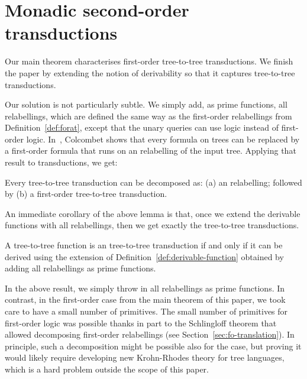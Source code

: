 \section{Monadic second-order transductions}
\label{sec:mso-trans}
Our main theorem characterises first-order tree-to-tree transductions. We finish the paper by extending the notion of derivability so that it captures  \mso tree-to-tree transductions. 

Our solution is not particularly subtle. We simply add, as prime functions, all \mso relabellings, which are defined the  same way as the first-order relabellings from Definition~\ref{def:forat}, except that the unary queries can use \mso logic instead of first-order logic. In~\cite[Corollary 1]{colcombetCombinatorialTheoremTrees2007}, Colcombet shows that every \mso formula on trees can be replaced by a first-order formula that runs on an \mso relabelling of the input tree. Applying that result to transductions, we get:
\begin{lemma}
    Every \mso tree-to-tree transduction can be decomposed as: (a) an \mso relabelling; followed by (b) a first-order tree-to-tree transduction.
\end{lemma}
An immediate corollary of the above lemma is that, once we extend the derivable functions with all \mso relabellings, then we get exactly the \mso tree-to-tree transductions. 
\begin{theorem}\label{thm:mso-transductions}
    A tree-to-tree function is an \mso tree-to-tree transduction if and only if it can be derived using the extension of Definition~\ref{def:derivable-function} obtained by adding  all \mso relabellings as prime functions. 
\end{theorem}
In the above result, we simply throw in all \mso relabellings as prime functions. In contrast,  in the first-order case from the main theorem of this paper, we took care to have a small number of primitives. The small number of primitives for first-order logic  was possible thanks in part to the Schlingloff theorem that allowed decomposing first-order relabellings (see Section~\ref{sec:fo-translation}).  In principle, such a decomposition might be possible also for the \mso case, but proving it  would likely require developing new Krohn-Rhodes theory for tree languages, which is a hard problem outside the scope of this paper.




